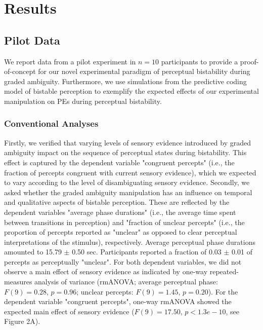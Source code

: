 \documentclass[12pt]{article}
\begin{document}
\section{Results}

\subsection{Pilot Data}

We report data from a pilot experiment in $n = 10$ participants to provide a proof-of-concept for our novel experimental paradigm of perceptual bistability during graded ambiguity. Furthermore, we use simulations from the predictive coding model of bistable perception to exemplify the expected effects of our experimental manipulation on PEs during perceptual bistability.

\subsubsection{Conventional Analyses}

Firstly, we verified that varying levels of sensory evidence introduced by graded ambiguity impact on the sequence of perceptual states during bistability. This effect is captured by the dependent variable "congruent percepts" (i.e., the fraction of percepts congruent with current sensory evidence), which we expected to vary according to the level of disambiguating sensory evidence. Secondly, we asked whether the graded ambiguity manipulation has an influence on temporal and qualitative aspects of bistable perception. These are reflected by the dependent variables "average phase durations" (i.e., the average time spent between transitions in perception) and "fraction of unclear percepts" (i.e., the proportion of percepts reported as "unclear" as opposed to clear perceptual interpretations of the stimulus), respectively. 
Average perceptual phase durations amounted to 15.79 $\pm$ 0.50 sec. Participants reported a fraction of 0.03 $\pm$ 0.01 of percepts as perceptually "unclear". For both dependent variables, we did not observe a main effect of sensory evidence as indicated by one-way repeated-measures analysis of variance (rmANOVA; average perceptual phase: $F(9) = 0.28$, $p = 0.96$; unclear percepts: $F(9) = 1.45$, $p = 0.20$). For the dependent variable "congruent percepts", one-way rmANOVA showed the expected main effect of sensory evidence ($F(9) = 17.50$, $p < 1.3e-10$, see Figure 2A).
\end{document}
